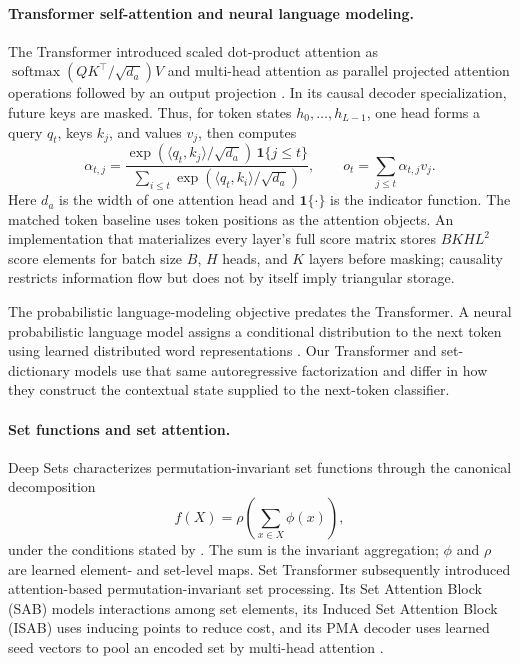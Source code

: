 \documentclass{article}
\theoremstyle{plain}
\theoremstyle{definition}
\theoremstyle{remark}
\begin{document}
\paragraph{Transformer self-attention and neural language modeling.}
The Transformer introduced scaled dot-product attention as
$\operatorname{softmax}(QK^\top/\sqrt{d_a})V$ and multi-head attention as
parallel projected attention operations followed by an output projection
\citep{vaswani2017attention}.  In its causal decoder specialization, future
keys are masked.  Thus, for token states $h_0,\ldots,h_{L-1}$, one head forms
a query $q_t$, keys $k_j$, and values $v_j$, then computes
\begin{equation}
\label{eq:background-token-attention}
\alpha_{t,j}=
\frac{\exp(\langle q_t,k_j\rangle/\sqrt{d_a})\,\mathbf 1\{j\le t\}}
{\sum_{i\le t}\exp(\langle q_t,k_i\rangle/\sqrt{d_a})},
\qquad
o_t=\sum_{j\le t}\alpha_{t,j}v_j .
\end{equation}
Here $d_a$ is the width of one attention head and $\mathbf 1\{\cdot\}$ is
the indicator function.  The matched token baseline uses token positions as
the attention objects.  An implementation that materializes every layer's full
score matrix stores $BKHL^2$ score elements for batch size $B$, $H$ heads, and
$K$ layers before masking; causality restricts information flow but does not by
itself imply triangular storage.

The probabilistic language-modeling objective predates the Transformer.  A
neural probabilistic language model assigns a conditional distribution to the
next token using learned distributed word representations
\citep{bengio2003neural}.  Our Transformer and set-dictionary models use that
same autoregressive factorization and differ in how they construct the
contextual state supplied to the next-token classifier.

\paragraph{Set functions and set attention.}
Deep Sets characterizes permutation-invariant set functions through the
canonical decomposition
\begin{equation}
\label{eq:background-deep-sets}
f(X)=\rho\!\left(\sum_{x\in X}\phi(x)\right),
\end{equation}
under the conditions stated by \citet{zaheer2017deepsets}.  The sum is the
invariant aggregation; $\phi$ and $\rho$ are learned element- and set-level
maps.  Set Transformer subsequently introduced attention-based
permutation-invariant set processing.  Its Set Attention Block (SAB) models
interactions among set elements, its Induced Set Attention Block (ISAB) uses
inducing points to reduce cost, and its PMA decoder uses learned seed vectors
to pool an encoded set by multi-head attention
\citep{lee2019settransformer}.
\end{document}
